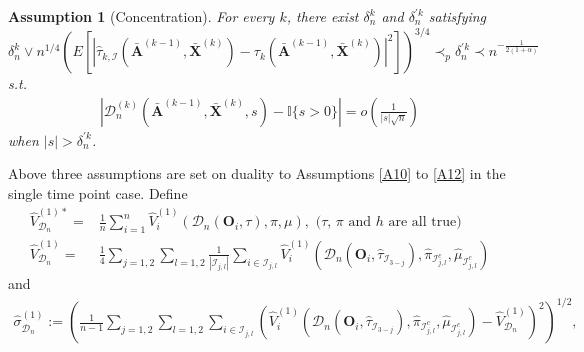 \documentclass[11pt]{article}
\theoremstyle{referenceplain}
\newtheorem{assumption}{Assumption}
\theoremstyle{referencedefinition}
\theoremstyle{referenceremark}
\begin{document}
\begin{assumption}[Concentration]\label{B12}
    {For every $k$, there exist} $\delta_n^k$ and $\delta_n^{\prime k}$ satisfying $$\delta_n^k\lor n^{1/4}\left(E[|\widehat{\tau}_{k,\mathcal{I}}(\bar{\mathbf{A}}^{(k-1)},\bar{\mathbf{X}}^{(k)})-\tau_k(\bar{\mathbf{A}}^{(k-1)},\bar{\mathbf{X}}^{(k)})|^2]\right)^{3/4}  \prec_p\delta_n^{\prime k}\prec n^{-\frac{1}{2(1+\alpha)}}$$ s.t. 
\begin{align}
    |{\mathcal{D}_n^{(k)}}(\bar{\mathbf{A}}^{(k-1)},\bar{\mathbf{X}}^{(k)},s)-{\mathbb{I}\{s>0\}}|=o\left(\frac{1}{{|s|}\sqrt{n}}\right)\label{B10-1}
\end{align}
when $|s|>\delta_n^{\prime k}$.
\end{assumption}
Above three assumptions are set on duality to Assumptions \ref{A10} to \ref{A12} in the single time point case. Define 
\begin{align}
\widehat{V}_{\mathcal{D}_n}^{(1)*}=&\frac{1}{n}\sum_{i=1}^n \widehat{V}_i^{(1)}(\mathcal{D}_n(\mathbf{O}_i,\tau),\pi,\mu),\text{ ($\tau$, $\pi$ and $h$ are all true)}\label{multi_VD_oracle}\\
    \widehat{V}_{\mathcal{D}_n}^{(1)}=&\frac{1}{4}\sum_{j=1,2}\sum_{l=1,2}\frac{1}{|\mathcal{I}_{j,l}|}\sum_{i\in\mathcal{I}_{j,l}}\widehat{V}_i^{(1)}(\mathcal{D}_n(\mathbf{O}_i,\widehat{\tau}_{\mathcal{I}_{3-j}}),\widehat{\pi}_{\mathcal{I}_{j,l}^c},\widehat{\mu}_{\mathcal{I}_{j,l}^c})\label{multi_VD}
\end{align}
and
\begin{align*}
    \widehat{\sigma}_{\mathcal{D}_n}^{(1)}:=\left(\frac{1}{n-1}\sum_{j=1,2}\sum_{l=1,2}\sum_{i\in\mathcal{I}_{j,l}}\left(\widehat{V}_i^{(1)}(\mathcal{D}_n(\mathbf{O}_i,\widehat{\tau}_{\mathcal{I}_{3-j}}),\widehat{\pi}_{\mathcal{I}_{j,l}^c},\widehat{\mu}_{\mathcal{I}_{j,l}^c})- \widehat{V}_{\mathcal{D}_n}^{(1)}\right)^2\right)^{1/2},
\end{align*}
\end{document}
